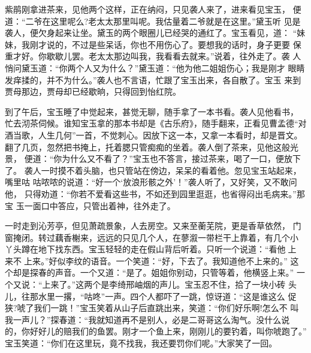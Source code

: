 紫鹃刚拿进茶来，见他两个这样，正在纳闷，只见袭人来了，进来看见宝玉，
便道：“二爷在这里呢么?老太太那里叫呢。我估量着二爷就是在这里。”黛玉听
见是袭人，便欠身起来让坐。黛玉的两个眼圈儿已经哭的通红了。宝玉看见，道：
“妹妹，我刚才说的，不过是些呆话，你也不用伤心了。要想我的话时，身子更要
保重才好。你歇歇儿罢。老太太那边叫我，我看看去就来。”说着，往外走了。袭
人悄问黛玉道：“你两个人又为什么？”黛玉道：“他为他二姐姐伤心；我是刚才
眼睛发痒揉的，并不为什么。”袭人也不言语，忙跟了宝玉出来，各自散了。宝玉
来到贾母那边，贾母却已经歇晌，只得回到怡红院。

到了午后，宝玉睡了中觉起来，甚觉无聊，随手拿了一本书看。袭人见他看书，
忙去沏茶伺候。谁知宝玉拿的那本书却是《古乐府》，随手翻来，正看见曹孟德“对
酒当歌，人生几何”一首，不觉刺心。因放下这一本，又拿一本看时，却是晋文。
翻了几页，忽然把书掩上，托着腮只管痴痴的坐着。袭人倒了茶来，见他这般光景，
便道：“你为什么又不看了？”宝玉也不答言，接过茶来，喝了一口，便放下了。
袭人一时摸不着头脑，也只管站在傍边，呆呆的看着他。忽见宝玉站起来，嘴里咕
咕哝哝的说道：“好一个‘放浪形骸之外’！”袭人听了，又好笑，又不敢问他，
只得劝道：“你若不爱看这些书，不如还到园里逛逛，也省得闷出毛病来。”那宝
玉一面口中答应，只管出着神，往外走了。

一时走到沁芳亭，但见萧疏景象，人去房空。又来至蘅芜院，更是香草依然，
门窗掩闭。转过藕香榭来，远远的只见几个人，在蓼溆一带栏干上靠着，有几个小
丫头蹲在地下找东西。宝玉轻轻的走在假山背后听着。只听一个说道：“看他上
来不上来。”好似李纹的语音。一个笑道：“好，下去了。我知道他不上来的。”
这个却是探春的声音。一个又道：“是了。姐姐你别动，只管等着，他横竖上来。”
一个又说：“上来了。”这两个是李绮邢岫烟的声儿。宝玉忍不住，拾了一块小砖
头儿，往那水里一撂，“咕咚”一声。四个人都吓了一跳，惊讶道：“这是谁这么
促狭?唬了我们一跳！”宝玉笑着从山子后直跳出来，笑道：“你们好乐啊!怎么不
叫我一声儿？”探春道：“我就知道再不是别人，必是二哥哥这么淘气。没什么说
的，你好好儿的赔我们的鱼罢。刚才一个鱼上来，刚刚儿的要钓着，叫你唬跑了。”
宝玉笑道：“你们在这里玩，竟不找我，我还要罚你们呢。”大家笑了一回。

